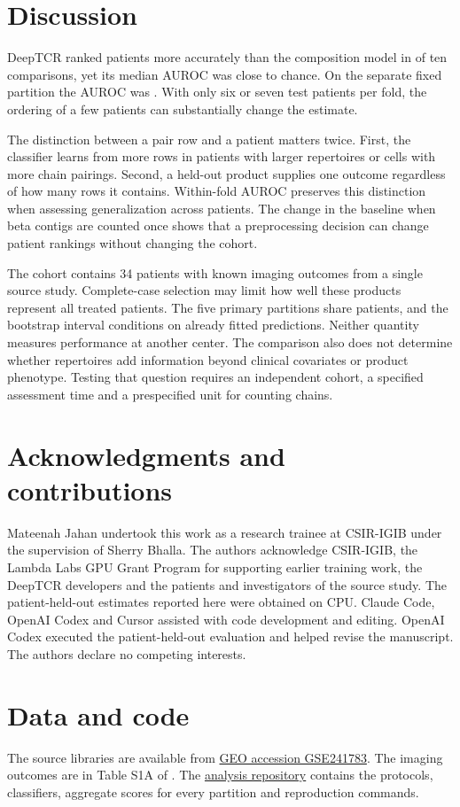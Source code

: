 \documentclass[11pt]{article}
\begin{document}
\FloatBarrier
\section{Discussion}
DeepTCR ranked patients more accurately than the composition model in \Above{} of ten comparisons, yet its median AUROC was close to chance. On the separate fixed partition the AUROC was \FixedAUC{}. With only six or seven test patients per fold, the ordering of a few patients can substantially change the estimate.

The distinction between a pair row and a patient matters twice. First, the classifier learns from more rows in patients with larger repertoires or cells with more chain pairings. Second, a held-out product supplies one outcome regardless of how many rows it contains. Within-fold AUROC preserves this distinction when assessing generalization across patients. The change in the baseline when beta contigs are counted once shows that a preprocessing decision can change patient rankings without changing the cohort.

The cohort contains 34 patients with known imaging outcomes from a single source study. Complete-case selection may limit how well these products represent all treated patients. The five primary partitions share patients, and the bootstrap interval conditions on already fitted predictions. Neither quantity measures performance at another center. The comparison also does not determine whether repertoires add information beyond clinical covariates or product phenotype. Testing that question requires an independent cohort, a specified assessment time and a prespecified unit for counting chains.

\section*{Acknowledgments and contributions}
Mateenah Jahan undertook this work as a research trainee at CSIR-IGIB under the supervision of Sherry Bhalla. The authors acknowledge CSIR-IGIB, the Lambda Labs GPU Grant Program for supporting earlier training work, the DeepTCR developers and the patients and investigators of the source study. The patient-held-out estimates reported here were obtained on CPU. Claude Code, OpenAI Codex and Cursor assisted with code development and editing. OpenAI Codex executed the patient-held-out evaluation and helped revise the manuscript. The authors declare no competing interests.

\section*{Data and code}
The source libraries are available from \href{https://www.ncbi.nlm.nih.gov/geo/query/acc.cgi?acc=GSE241783}{GEO accession GSE241783}. The imaging outcomes are in Table S1A of \citet{li2023atlas}. The \href{https://github.com/MateenahJAHAN/Final_Deliverable_DeepTCRResearch_Mateenah_Jahan_CSIR}{analysis repository} contains the protocols, classifiers, aggregate scores for every partition and reproduction commands.
\end{document}
